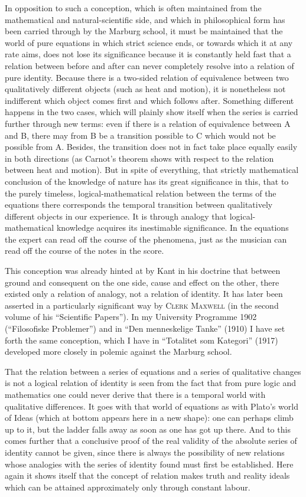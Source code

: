\documentclass[12pt]{article}
\newcommand{\opage}[1]{\marginnote{\footnotesize\textit{[#1]}}}
\begin{document}
In opposition to such a conception, which is often maintained from the
mathematical and natural-scientific side, and which in philosophical form
has been carried through by the Marburg school, it must be maintained that
the world of pure equations in which strict science ends, or towards which
it at any rate aims, does not lose its significance because it is constantly
held fast that a relation between before and after can never completely
resolve into a relation of pure identity. Because there is a two-sided
relation of equivalence between two qualitatively different objects (such as
heat and motion), it is nonetheless not indifferent which object comes first
and which follows after. Something different happens in the two cases, which
will plainly show itself when the series is carried further through new
terms: even if there is a relation of equivalence between A and B, there may
from B be a transition possible to C which would not be possible from A.
Besides, the transition does not in fact take place equally easily in both
directions (as Carnot's theorem shows with respect to the relation between
heat and motion). But in spite of everything, that strictly mathematical
conclusion of the knowledge of nature has its great significance in this,
that to the purely timeless, logical-mathematical relation between the terms
of the equations there corresponds the temporal \opage{52}transition between
qualitatively different objects in our experience. It is through analogy
that logical-mathematical knowledge acquires its inestimable significance.
In the equations the expert can read off the course of the phenomena, just
as the musician can read off the course of the notes in the score.

This conception was already hinted at by Kant in his doctrine that between
ground and consequent on the one side, cause and effect on the other, there
existed only a relation of analogy, not a relation of identity. It has later
been asserted in a particularly significant way by \textsc{Clerk Maxwell}
(in the second volume of his ``Scientific Papers''). In my University
Programme 1902 (``Filosofiske Problemer'') and in ``Den menneskelige
Tanke'' (1910) I have set forth the same conception, which I have in
``Totalitet som Kategori'' (1917) developed more closely in polemic against
the Marburg school.

That the relation between a series of equations and a series of qualitative
changes is not a logical relation of identity is seen from the fact that
from pure logic and mathematics one could never derive that there is a
temporal world with qualitative differences. It goes with that world of
equations as with Plato's world of Ideas (which at bottom appears here in a
new shape): one can perhaps climb up to it, but the ladder falls away as
soon as one has got up there. And to this comes further that a conclusive
proof of the real validity of the absolute series of identity cannot be
given, since there is always the possibility of new relations whose
analogies with the series of identity found must first be established. Here
again it shows itself that the concept of relation makes truth and reality
ideals which can be attained approximately only through constant labour.
\end{document}
